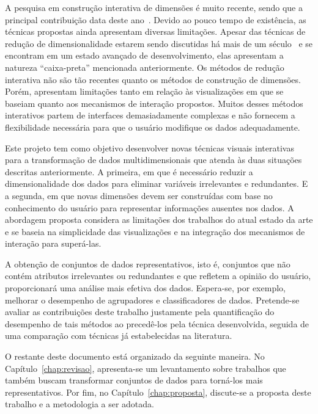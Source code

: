 A pesquisa em construção interativa de dimensões é muito
recente, sendo que a principal contribuição data deste
ano~\cite{Gladys2013}. Devido ao pouco tempo de existência,
as técnicas propostas ainda apresentam diversas limitações.
Apesar das técnicas de redução de dimensionalidade estarem
sendo discutidas há mais de um século~\cite{Pearson1901} e
se encontram em um estado avançado de desenvolvimento, elas
apresentam a natureza ``caixa-preta'' mencionada
anteriormente.  Os métodos de redução interativa não são tão
recentes quanto os métodos de construção de dimensões.
Porém, apresentam limitações tanto em relação às
visualizações em que se baseiam quanto aos mecanismos de
interação propostos.  Muitos desses métodos interativos
partem de interfaces demasiadamente complexas e não fornecem
a flexibilidade necessária para que o usuário modifique os
dados adequadamente.

Este projeto tem como objetivo desenvolver novas
técnicas visuais interativas para a transformação de dados
multidimensionais que atenda às duas situações descritas
anteriormente. A primeira, em que é necessário reduzir a
dimensionalidade dos dados para eliminar variáveis
irrelevantes e redundantes. E a segunda, em que novas
dimensões devem ser construídas com base no conhecimento do
usuário para representar informações ausentes nos dados. A
abordagem proposta considera as limitações dos
trabalhos do atual estado da arte e se baseia na
simplicidade das visualizações e na integração  dos
mecanismos de interação para superá-las. 

A obtenção de conjuntos de dados representativos, isto é,
conjuntos que não contém atributos irrelevantes ou
redundantes e que refletem a opinião do usuário,
proporcionará uma análise mais efetiva dos dados. Espera-se,
por exemplo, melhorar o desempenho de agrupadores e
classificadores de dados. Pretende-se avaliar as
contribuições deste trabalho justamente pela quantificação
do desempenho de tais métodos ao precedê-los pela técnica
desenvolvida, seguida de uma comparação com técnicas já
estabelecidas na literatura.


O restante deste documento está organizado da seguinte
maneira. No Capítulo~\ref{chap:revisao}, apresenta-se um
levantamento sobre trabalhos que também buscam transformar
conjuntos de dados para torná-los mais representativos. Por
fim, no Capítulo~\ref{chap:proposta}, discute-se a proposta
deste trabalho e a metodologia a ser adotada. 

